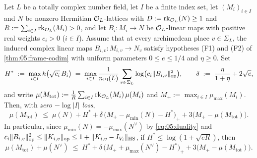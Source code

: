 \begin{theorem}
\label{thm:05:bost-slope}
Let $L$ be a totally complex number field, let $I$ be a finite index set, let $(M_i)_{i \in I}$ and $N$ be nonzero Hermitian $\mathcal{O}_L$-lattices with $D := \operatorname{rk}_{\mathcal{O}_L}(N) \ge 1$ and $R := \sum_{i \in I} \operatorname{rk}_{\mathcal{O}_L}(M_i) > 0$, and let $B_i : M_i \to N$ be $\mathcal{O}_L$-linear maps with positive real weights $c_i > 0$ ($i \in I$). Assume that at every archimedean place $v \in \Sigma_L$, the induced complex linear maps $B_{i,v} : M_{i,v} \to N_v$ satisfy hypotheses \textup{(F1)} and \textup{(F2)} of \cref{thm:05:frame-codim} with uniform parameters $0 \le e \le 1/4$ and $\eta \ge 0$. Set
\[
  H^* \;:=\; \max_{i \in I} h\bigl(\sqrt{c_i}\, B_i\bigr) \;=\; \max_{i \in I} \frac{1}{n_{\mathrm{Pl}}(L)}\sum_{v \in \Sigma_L} \log\bigl(c_i \|B_{i,v}\|_{\mathrm{op}}^2\bigr),
  \qquad
  \delta \;:=\; \frac{\eta}{1 + \eta} + 2\sqrt{e},
\]
and write $\mu(M_{\mathrm{tot}}) := \frac{1}{R}\sum_{i \in I} \operatorname{rk}_{\mathcal{O}_L}(M_i)\,\mu(M_i)$ and $M_+ := \max_{i \in I} \mu_{\max}(M_i)$. Then, with \emph{zero $-\log|I|$ loss},
\begin{equation}
\label{eq:05:multi-bost}
  \mu(M_{\mathrm{tot}})
  \;\le\; \mu(N) + H^* + \delta\,\bigl(M_+ - \mu_{\min}(N) - H^*\bigr)_+
  + 3\bigl(M_+ - \mu(M_{\mathrm{tot}})\bigr).
\end{equation}
In particular, since $\mu_{\min}(N) = -\mu_{\max}(N^\vee)$ by \eqref{eq:05:duality} and $c_i \|B_{i,v}\|_{\mathrm{op}}^2 \le \|K_{i,v}\|_{\mathrm{op}} \le 1 + \|K_{i,v} - I_{V_i}\|_{\mathrm{HS}}$, if $H^* \le \log(1 + \sqrt{e R})$, then
\begin{equation}
\label{eq:05:multi-bost-dual}
  \mu(M_{\mathrm{tot}}) + \mu(N^\vee)
  \;\le\; H^* + \delta\,\bigl(M_+ + \mu_{\max}(N^\vee) - H^*\bigr)_+
  + 3\bigl(M_+ - \mu(M_{\mathrm{tot}})\bigr).
\end{equation}
\end{theorem}


